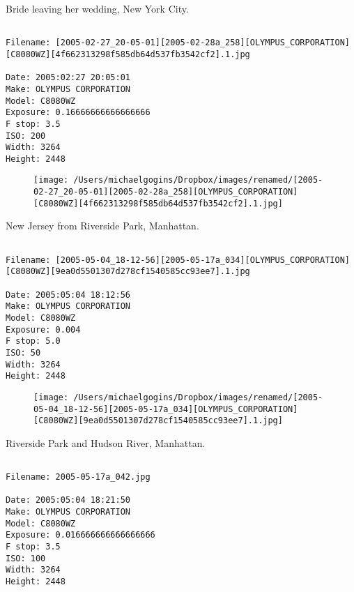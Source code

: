 \clearpage
\onecolumn
\noindent Bride leaving her wedding, New York City.
\noindent
\begin{lstlisting}

Filename: [2005-02-27_20-05-01][2005-02-28a_258][OLYMPUS_CORPORATION][C8080WZ][4f662313298f585db64d537fb3542cf2].1.jpg

Date: 2005:02:27 20:05:01
Make: OLYMPUS CORPORATION
Model: C8080WZ
Exposure: 0.16666666666666666
F stop: 3.5
ISO: 200
Width: 3264
Height: 2448
\end{lstlisting}
\clearpage

\begin{figure}
\texttt{[image: /Users/michaelgogins/Dropbox/images/renamed/[2005-02-27\_20-05-01][2005-02-28a\_258][OLYMPUS\_CORPORATION][C8080WZ][4f662313298f585db64d537fb3542cf2].1.jpg]}
\end{figure}
    
\clearpage
\onecolumn
\noindent New Jersey from Riverside Park, Manhattan.
\noindent
\begin{lstlisting}

Filename: [2005-05-04_18-12-56][2005-05-17a_034][OLYMPUS_CORPORATION][C8080WZ][9ea0d5501307d278cf1540585cc93ee7].1.jpg

Date: 2005:05:04 18:12:56
Make: OLYMPUS CORPORATION
Model: C8080WZ
Exposure: 0.004
F stop: 5.0
ISO: 50
Width: 3264
Height: 2448
\end{lstlisting}
\clearpage

\begin{figure}
\texttt{[image: /Users/michaelgogins/Dropbox/images/renamed/[2005-05-04\_18-12-56][2005-05-17a\_034][OLYMPUS\_CORPORATION][C8080WZ][9ea0d5501307d278cf1540585cc93ee7].1.jpg]}
\end{figure}
    
\clearpage
\onecolumn
\noindent Riverside Park and Hudson River, Manhattan.
\noindent
\begin{lstlisting}

Filename: 2005-05-17a_042.jpg

Date: 2005:05:04 18:21:50
Make: OLYMPUS CORPORATION
Model: C8080WZ
Exposure: 0.016666666666666666
F stop: 3.5
ISO: 100
Width: 3264
Height: 2448
\end{lstlisting}
\clearpage


